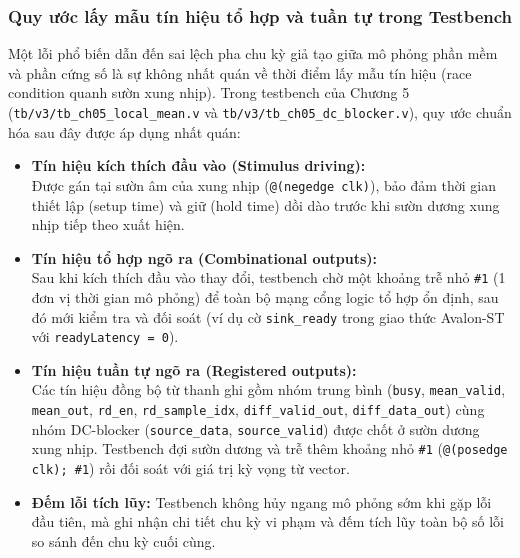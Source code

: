 \subsubsection*{Quy ước lấy mẫu tín hiệu tổ hợp và tuần tự trong Testbench}
Một lỗi phổ biến dẫn đến sai lệch pha chu kỳ giả tạo giữa mô phỏng phần mềm và phần cứng số là sự không nhất quán về thời điểm lấy mẫu tín hiệu (race condition quanh sườn xung nhịp). Trong testbench của Chương 5 (\texttt{tb/v3/tb\_ch05\_local\_mean.v} và \texttt{tb/v3/tb\_ch05\_dc\_blocker.v}), quy ước chuẩn hóa sau đây được áp dụng nhất quán:
\begin{itemize}[leftmargin=1.5em, itemsep=2pt]
    \item \textbf{Tín hiệu kích thích đầu vào (Stimulus driving):}\\
    Được gán tại sườn âm của xung nhịp (\texttt{@(negedge clk)}), bảo đảm thời gian thiết lập (setup time) và giữ (hold time) dồi dào trước khi sườn dương xung nhịp tiếp theo xuất hiện.
    \item \textbf{Tín hiệu tổ hợp ngõ ra (Combinational outputs):}\\
    Sau khi kích thích đầu vào thay đổi, testbench chờ một khoảng trễ nhỏ \texttt{\#1} (1 đơn vị thời gian mô phỏng) để toàn bộ mạng cổng logic tổ hợp ổn định, sau đó mới kiểm tra và đối soát (ví dụ cờ \texttt{sink\_ready} trong giao thức Avalon-ST với \texttt{readyLatency = 0}).
    \item \textbf{Tín hiệu tuần tự ngõ ra (Registered outputs):}\\
    Các tín hiệu đồng bộ từ thanh ghi gồm nhóm trung bình (\texttt{busy}, \texttt{mean\_valid}, \texttt{mean\_out}, \texttt{rd\_en}, \texttt{rd\_sample\_idx}, \texttt{diff\_valid\_out}, \texttt{diff\_data\_out}) cùng nhóm DC-blocker (\texttt{source\_data}, \texttt{source\_valid}) được chốt ở sườn dương xung nhịp. Testbench đợi sườn dương và trễ thêm khoảng nhỏ \texttt{\#1} (\texttt{@(posedge clk); \#1}) rồi đối soát với giá trị kỳ vọng từ vector.
    \item \textbf{Đếm lỗi tích lũy:} Testbench không hủy ngang mô phỏng sớm khi gặp lỗi đầu tiên, mà ghi nhận chi tiết chu kỳ vi phạm và đếm tích lũy toàn bộ số lỗi so sánh đến chu kỳ cuối cùng.
\end{itemize}

